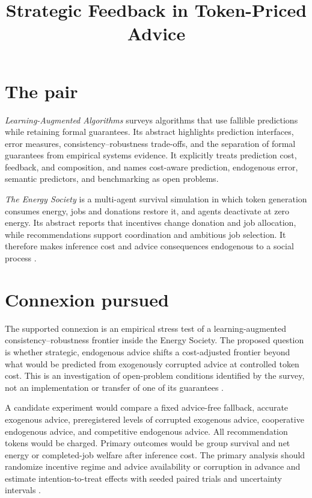 \documentclass{article}
\title{Strategic Feedback in Token-Priced Advice}
\begin{document}
\maketitle

\section{The pair}

\emph{Learning-Augmented Algorithms} surveys algorithms that use fallible predictions while retaining formal guarantees.  Its abstract highlights prediction interfaces, error measures, consistency--robustness trade-offs, and the separation of formal guarantees from empirical systems evidence.  It explicitly treats prediction cost, feedback, and composition, and names cost-aware prediction, endogenous error, semantic predictors, and benchmarking as open problems.

\emph{The Energy Society} is a multi-agent survival simulation in which token generation consumes energy, jobs and donations restore it, and agents deactivate at zero energy.  Its abstract reports that incentives change donation and job allocation, while recommendations support coordination and ambitious job selection.  It therefore makes inference cost and advice consequences endogenous to a social process .

\section{Connexion pursued}

The supported connexion is an empirical stress test of a learning-augmented consistency--robustness frontier inside the Energy Society.  The proposed question is whether strategic, endogenous advice shifts a cost-adjusted frontier beyond what would be predicted from exogenously corrupted advice at controlled token cost.  This is an investigation of open-problem conditions identified by the survey, not an implementation or transfer of one of its guarantees .

A candidate experiment would compare a fixed advice-free fallback, accurate exogenous advice, preregistered levels of corrupted exogenous advice, cooperative endogenous advice, and competitive endogenous advice.  All recommendation tokens would be charged.  Primary outcomes would be group survival and net energy or completed-job welfare after inference cost.  The primary analysis should randomize incentive regime and advice availability or corruption in advance and estimate intention-to-treat effects with seeded paired trials and uncertainty intervals .
\end{document}
